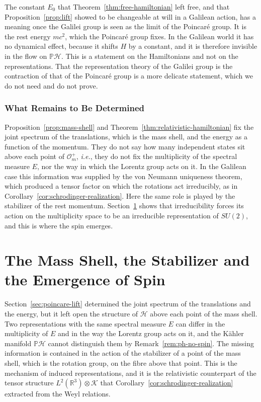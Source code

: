 	\noindent The constant $E_0$ that Theorem~\ref{thm:free-hamiltonian} left free, and that Proposition~\ref{prop:lift} showed to be changeable at will in a Galilean action, has a meaning once the Galilei group is seen as the limit of the Poincar\'e group. It is the rest energy $mc^2$, which the Poincar\'e group fixes. In the Galilean world it has no dynamical effect, because it shifts $H$ by a constant, and it is therefore invisible in the flow on $\mathbb{P}\mathcal{H}$. This is a statement on the Hamiltonians and not on the representations. That the representation theory of the Galilei group is the contraction of that of the Poincar\'e group is a more delicate statement, which we do not need and do not prove.
	
	\subsubsection*{What Remains to Be Determined}
	
	\begin{remark}\label{rem:undetermined}
		Proposition~\ref{prop:mass-shell} and Theorem~\ref{thm:relativistic-hamiltonian} fix the joint spectrum of the translations, which is the mass shell, and the energy as a function of the momentum. They do not say how many independent states sit above each point of $\mathcal{O}_m^+$, \textit{i.e.}, they do not fix the multiplicity of the spectral measure $E$, nor the way in which the Lorentz group acts on it. In the Galilean case this information was supplied by the von Neumann uniqueness theorem, which produced a tensor factor on which the rotations act irreducibly, as in Corollary~\ref{cor:schrodinger-realization}. Here the same role is played by the stabilizer of the rest momentum. Section~\ref{sec:induced} shows that irreducibility forces its action on the multiplicity space to be an irreducible representation of $SU(2)$, and this is where the spin emerges.
	\end{remark}
	
	
	\section{The Mass Shell, the Stabilizer and the Emergence of Spin}
	\label{sec:induced}
	
	Section~\ref{sec:poincare-lift} determined the joint spectrum of the translations and the energy, but it left open the structure of $\mathcal{H}$ above each point of the mass shell. Two representations with the same spectral measure $E$ can differ in the multiplicity of $E$ and in the way the Lorentz group acts on it, and the Kähler manifold $\mathbb{P}\mathcal{H}$ cannot distinguish them by Remark~\ref{rem:ph-no-spin}. The missing information is contained in the action of the stabilizer of a point of the mass shell, which is the rotation group, on the fibre above that point. This is the mechanism of induced representations, and it is the relativistic counterpart of the tensor structure $L^2(\mathbb{R}^3)\otimes\mathcal{K}$ that Corollary~\ref{cor:schrodinger-realization} extracted from the Weyl relations.
	
